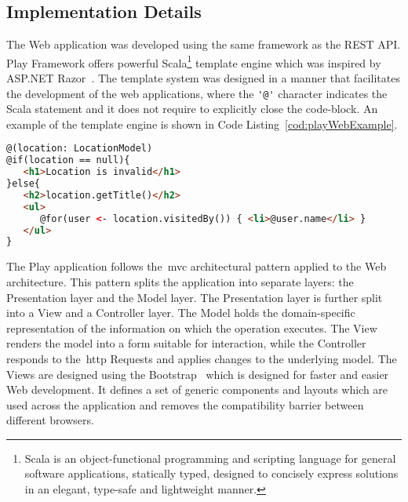 \subsection{Implementation Details}
\label{subsec:webAppImplementation}
The Web application was developed using the same framework as the REST API. Play Framework offers powerful Scala\footnote{Scala is an object-functional programming and scripting language for general software applications, statically typed, designed to concisely express solutions in an elegant, type-safe and lightweight manner.} template engine which was inspired by ASP.NET Razor~\cite{aspNetRazor}. The template system was designed in a manner that facilitates the development of the web applications, where the \verb"'@'" character indicates the Scala statement and it does not require to explicitly close the code-block. An example of the template engine is shown in Code Listing~\ref{cod:playWebExample}.\\
\begin{lstlisting}[language=HTML,caption={An example of the Scala template.},label={cod:playWebExample}, frame=bt, belowskip=3em]
@(location: LocationModel)
@if(location == null){
   <h1>Location is invalid</h1>
}else{
   <h2>location.getTitle()</h2>
   <ul>
      @for(user <- location.visitedBy()) { <li>@user.name</li> }
   </ul>
}
\end{lstlisting} 
The Play application follows the~\gls{mvc} architectural pattern applied to the Web architecture. This pattern splits the application into separate layers: the Presentation layer and the Model layer. The Presentation layer is further split into a View and a Controller layer. The Model holds the domain-specific representation of the information on which the operation executes. The View renders the model into a form suitable for interaction, while the Controller responds to the~\gls{http} Requests and applies changes to the underlying model. The Views are designed using the Bootstrap~\cite{twitterBootstrap} which is designed for faster and easier Web development. It defines a set of generic components and layouts which are used across the application and removes the compatibility barrier between different browsers.
